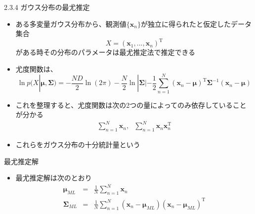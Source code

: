 \begin{frame}{2.3.4 ガウス分布の最尤推定}
 \begin{itemize}
  \item  ある多変量ガウス分布から、観測値$\{\bm{x}_n\}$が独立に得られたと仮定したデータ集合
         \begin{equation}
          X=(\bm{x}_1,...,\bm{x}_n)^{\mathrm{T}}
         \end{equation}
         がある時その分布のパラメータは最尤推定法で推定できる
  \item 尤度関数は、
        \begin{equation}
         \ln  p(X|\bm{\mu}, \bm{\Sigma}) = -\frac{ND}{2}\ln (2\pi)-\frac{N}{2}\ln |\bm{\Sigma}|-\frac{1}{2}\sum_{n=1}^{N}(\bm{x}_n-\bm{\mu})^{\mathrm{T}}\bm{\Sigma}^{-1}(\bm{x}_n-\bm{\mu})
        \end{equation}
  \item これを整理すると、尤度関数は次の2つの量によってのみ依存していることが分かる
        \begin{eqnarray}
         \sum_{n=1}^{N}\bm{x}_n, \ \ \  \sum_{n=1}^{N}\bm{x}_n\bm{x}_n^{\mathrm{T}}
        \end{eqnarray}
  \item これらをガウス分布の\alert{十分統計量}という
 \end{itemize}
\end{frame}

\begin{frame}{最尤推定解}
 \begin{itemize}
  \item 最尤推定解は次のとおり
        \begin{eqnarray}
         \bm{\mu}_{ML} &=& \frac{1}{N}\sum_{n=1}^{N}\bm{x}_n\\
         \bm{\Sigma}_{ML}&=&\frac{1}{N}\sum_{n=1}^{N}(\bm{x}_n-\bm{\mu}_{ML})(\bm{x}_n-\bm{\mu}_{ML})^{\mathrm{T}}
        \end{eqnarray}
 \end{itemize}
\end{frame}

